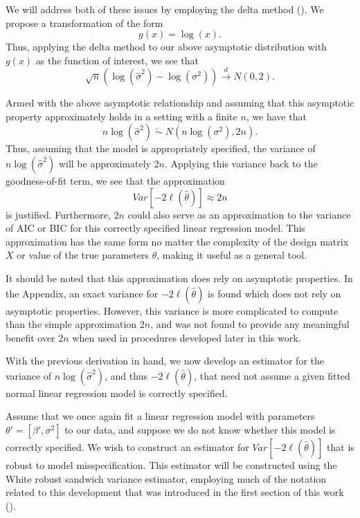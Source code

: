 \documentclass[12pt]{article} %
\theoremstyle{definition}
\begin{document}
		We will address both of these issues by employing the delta method (\cite{Rao}). We propose a transformation of the form
		\begin{equation*}
			g(x) = \log(x) .
		\end{equation*}
		Thus, applying the delta method to our above asymptotic distribution with $g(x)$ as the function of interest, we see that
		\begin{equation*}
			\sqrt{n} ( \log (\hat{\sigma}^2) - \log(\sigma^2)) \xrightarrow[]{d} N(0, 2) .
		\end{equation*}

		Armed with the above asymptotic relationship and assuming that this asymptotic property approximately holds in a setting with a finite $n$, we have that
		\begin{equation*}
			n\log(\hat{\sigma}^2) \; \dot\sim \; N \left( n\log(\sigma^2), 2n \right) .
		\end{equation*}
		Thus, assuming that the model is appropriately specified, the variance of $n\log(\hat{\sigma}^2)$ will be approximately $2n$. Applying this variance back to the goodness-of-fit term,
		we see that the approximation
		\begin{equation*}
			Var \left[ -2 \ell (\hat{\theta}  ) \right] \approx 2n
		\end{equation*}
		is justified. Furthermore, $2n$ could also serve as an approximation to the variance of AIC or BIC for this correctly specified linear regression model. This approximation
		has the same form no matter the complexity of the design matrix $X$ or value of the true parameters $\theta$, making it useful as a
		general tool.

		It should be noted that this approximation does rely on asymptotic properties. In the Appendix, an exact variance for $-2 \ell (\hat{\theta})$ is found which does
		not rely on asymptotic properties. However, this variance is more complicated to compute than the simple approximation $2n$, and was not found to provide any meaningful
		benefit over $2n$ when used in procedures developed later in this work.

		With the previous derivation in hand, we now develop an estimator for the variance of $n\log(\hat{\sigma}^2)$, and thus $-2 \ell (\hat{\theta})$,
		that need not assume a given fitted normal linear regression model is correctly specified.

		Assume that we once again fit a linear regression model with parameters $\theta' = [\beta', \sigma^2]$ to our data, and suppose we do not know whether this model is correctly specified.
		We wish to construct an estimator for $Var \left[ -2 \ell (\hat{\theta}  ) \right]$ that is robust to model misspecification. This estimator will be constructed using the White robust
		sandwich variance estimator, employing much of the notation related to this development that was introduced in the first section of this work (\cite{White1980}).
\end{document}
